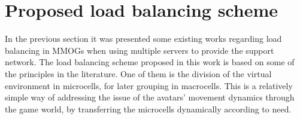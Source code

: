 %
%
%
%

\section{Proposed load balancing scheme}
\label{sec:scheme}

In the previous section it was presented some existing works regarding load balancing in MMOGs when using multiple servers to provide the support network. The load balancing scheme proposed in this work is based on some of the principles in the literature. One of them is the division of the virtual environment in microcells, for later grouping in macrocells. This is a relatively simple way of addressing the issue of the avatars' movement dynamics through the game world, by transferring the microcells dynamically according to need.

